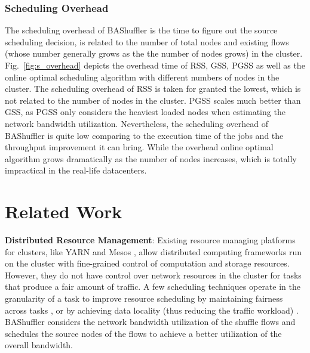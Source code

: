 \documentclass[10pt,journal,compsoc]{IEEEtran}
\begin{document}
\subsubsection{Scheduling Overhead}\label{section:eva_overhead}
The scheduling overhead of BAShuffler is the time to figure out the source scheduling decision, is related to the number of total nodes and existing flows (whose number generally grows as the the number of nodes grows) in the cluster. 
Fig.~\ref{fig:s_overhead} depicts the overhead time of RSS, GSS, PGSS as well as the online optimal scheduling algorithm
with different numbers of nodes in the cluster.
The scheduling overhead of RSS is taken for granted the lowest, which is not related to the number of nodes in the cluster. 
PGSS scales much better than GSS, as PGSS only considers the heaviest loaded nodes when estimating the network bandwidth utilization. 
Nevertheless, the scheduling overhead of BAShuffler is quite low comparing to the execution time of the jobs and the throughput improvement it can bring. 
While the overhead online optimal algorithm grows dramatically as the number of nodes increases, which is totally impractical in the real-life datacenters. 




\section{Related Work}\label{section:relatedwork}
\textbf{Distributed Resource Management}:
Existing resource managing platforms for clusters, like YARN
\cite{vavilapalli2013apache} and Mesos \cite{hindman2011mesos},
allow distributed computing frameworks run on the cluster with
fine-grained control of computation and storage resources.
However, they do not have control over network resources in the cluster for
tasks that produce a fair amount of traffic.
A few scheduling techniques operate in the granularity of a task to improve
resource scheduling by maintaining fairness across tasks
\cite{zaharia2010delay, isard2009quincy},
or by achieving data locality (thus reducing the traffic workload)
\cite{dean2008mapreduce, zaharia2008improving,faraz2014shufflewatcher}.
BAShuffler considers the network bandwidth utilization of the shuffle
flows and schedules the source nodes of the flows to achieve a better
utilization of the overall bandwidth.
\end{document}
